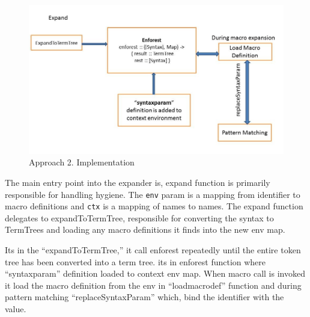 \newpage
\begin{figure}[htb]
\centering
\includegraphics[width=1.0\textwidth]{images/CodeWorking.jpg}
\caption{ Approach 2. Implementation } 
\label{fig:AST7}
\end{figure}

The main entry point into the expander is, expand function is primarily responsible for handling hygiene. The \texttt{env} param is a mapping from identifier to macro definitions and \texttt{ctx} is a mapping of names to names. The expand function delegates to expandToTermTree, responsible for converting the syntax to TermTrees and loading any macro definitions it finds into the new env map.

Its in the ``expandToTermTree,'' it call enforest repeatedly until the entire token tree has been converted into a term tree. its in enforest function where ``syntaxparam'' definition loaded to context env map. When macro call is invoked it load the macro definition from the env in ``loadmacrodef'' function and during pattern matching ``replaceSyntaxParam'' which, bind the identifier with the value.
